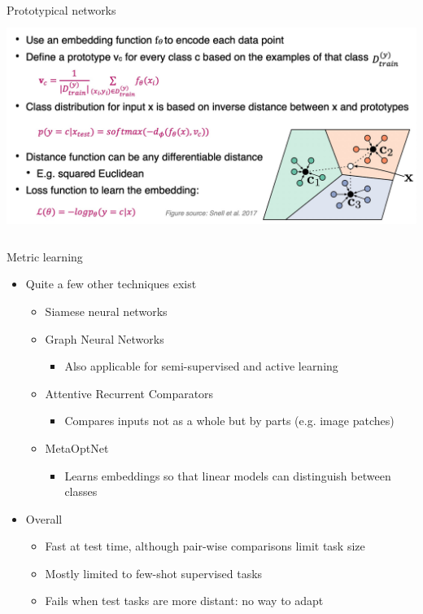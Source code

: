 \documentclass[aspectratio=169,t,handout,xcolor={usenames,dvipsnames}]{beamer}
\begin{document}
\begin{frame}{Prototypical networks}
    \centering\includegraphics[height=7cm]{image/Jietu20220329-013030.jpg}
\end{frame}
\begin{frame}{Metric learning}
    \begin{itemize}
        \item Quite a few other techniques exist
        \begin{itemize}
            \item Siamese neural networks 
            \item Graph Neural Networks 
            \begin{itemize}
                \item Also applicable for semi-supervised and active learning
            \end{itemize}
            \item Attentive Recurrent Comparators 
            \begin{itemize}
                \item Compares inputs not as a whole but by parts (e.g. image patches)
            \end{itemize}
            \item MetaOptNet
            \begin{itemize}
                \item Learns embeddings so that linear models can distinguish between classes
            \end{itemize}
        \end{itemize}
        \item Overall
        \begin{itemize}
            \item Fast at test time, although pair-wise comparisons limit task size
            \item Mostly limited to few-shot supervised tasks
            \item Fails when test tasks are more distant: no way to adapt
        \end{itemize}
    \end{itemize}
\end{frame}
\end{document}
